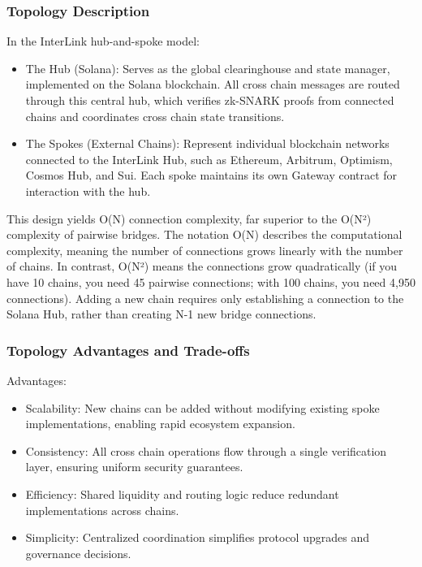 \documentclass[11pt,a4paper]{article}
\begin{document}
\subsubsection{Topology Description}
In the InterLink hub-and-spoke model:
\begin{itemize}
    \item The Hub (Solana): Serves as the global clearinghouse and state manager, implemented on the Solana blockchain. All cross chain messages are routed through this central hub, which verifies zk-SNARK proofs from connected chains and coordinates cross chain state transitions.
    \item The Spokes (External Chains): Represent individual blockchain networks connected to the InterLink Hub, such as Ethereum, Arbitrum, Optimism, Cosmos Hub, and Sui. Each spoke maintains its own Gateway contract for interaction with the hub.
\end{itemize}

This design yields O(N) connection complexity, far superior to the O(N²) complexity of pairwise bridges. The notation O(N) describes the computational complexity, meaning the number of connections grows linearly with the number of chains. In contrast, O(N²) means the connections grow quadratically (if you have 10 chains, you need 45 pairwise connections; with 100 chains, you need 4,950 connections). Adding a new chain requires only establishing a connection to the Solana Hub, rather than creating N-1 new bridge connections.

\subsubsection{Topology Advantages and Trade-offs}

Advantages:
\begin{itemize}
    \item Scalability: New chains can be added without modifying existing spoke implementations, enabling rapid ecosystem expansion.
    \item Consistency: All cross chain operations flow through a single verification layer, ensuring uniform security guarantees.
    \item Efficiency: Shared liquidity and routing logic reduce redundant implementations across chains.
    \item Simplicity: Centralized coordination simplifies protocol upgrades and governance decisions.
\end{itemize}
\end{document}
